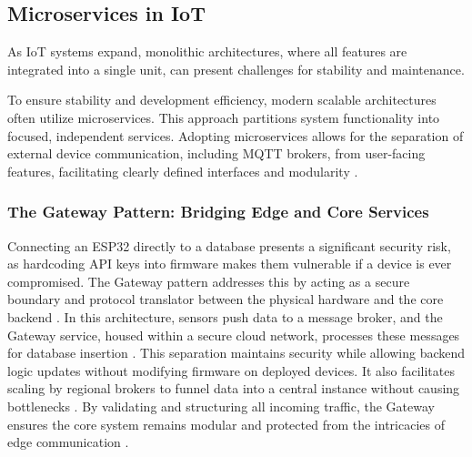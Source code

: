 \subsection{Microservices in IoT}

As IoT systems expand, monolithic architectures, where all features are integrated into a single unit, can present challenges for stability and maintenance. 

To ensure stability and development efficiency, modern scalable architectures often utilize microservices. This approach partitions system functionality into focused, independent services. Adopting microservices allows for the separation of external device communication, including MQTT brokers, from user-facing features, facilitating clearly defined interfaces and modularity \cite{microservices_io_gateway}.

\subsubsection{The Gateway Pattern: Bridging Edge and Core Services}
Connecting an ESP32 directly to a database presents a significant security risk, as hardcoding API keys into firmware makes them vulnerable if a device is ever compromised. The Gateway pattern addresses this by acting as a secure boundary and protocol translator between the physical hardware and the core backend \cite{microservices_io_gateway, microservices_io_patterns, microservices_io_apigateway}. In this architecture, sensors push data to a message broker, and the Gateway service, housed within a secure cloud network, processes these messages for database insertion \cite{microservices_io_apigateway}. This separation maintains security while allowing backend logic updates without modifying firmware on deployed devices. It also facilitates scaling by regional brokers to funnel data into a central instance without causing bottlenecks \cite{digitalapi_gateway_pattern, microservices_io_apigateway}. By validating and structuring all incoming traffic, the Gateway ensures the core system remains modular and protected from the intricacies of edge communication \cite{microservices_io_apigateway}.

